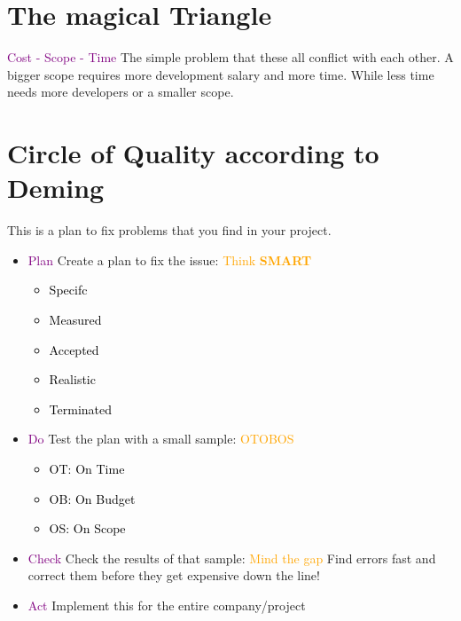 \documentclass[main.tex,fontsize=12pt,paper=a4,paper=landscape,DIV=calc,]{scrartcl}
\begin{document}
\begin{multicols*}{2}

\section{The magical Triangle}
\textcolor{purple}{Cost - Scope - Time}
The simple problem that these all conflict with each other.\newline
A bigger scope requires more development salary and more time.\newline
While less time needs more developers or a smaller scope.

\section{Circle of Quality according to Deming}
This is a plan to fix problems that you find in your project.\newline
\begin{itemize}
\item \textcolor{purple}{Plan}\newline
  Create a plan to fix the issue:\newline
  \textcolor{orange}{Think \textbf{SMART}}\newline
  \begin{itemize}
  \item \textcolor{black}{Specifc}
  \item \textcolor{black}{Measured}
  \item \textcolor{black}{Accepted}
  \item \textcolor{black}{Realistic}
  \item \textcolor{black}{Terminated}
  \end{itemize} 
\item \textcolor{purple}{Do}\newline 
  Test the plan with a small sample:\newline
  \textcolor{orange}{OTOBOS}\newline
  \begin{itemize}
  \item \textcolor{black}{OT: On Time}
  \item \textcolor{black}{OB: On Budget}
  \item \textcolor{black}{OS: On Scope}
  \end{itemize} 
\item \textcolor{purple}{Check}\newline
  Check the results of that sample:\newline
  \textcolor{orange}{Mind the gap}\newline
  Find errors fast and correct them before they get expensive down the line!
\item \textcolor{purple}{Act}\newline
  Implement this for the entire company/project
\end{itemize} 


\end{multicols*}
\end{document}
